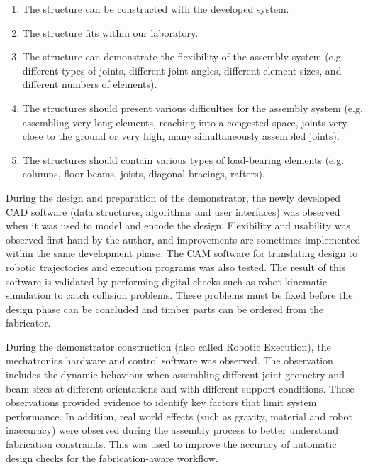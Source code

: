 \documentclass[11pt]{book}
\begin{document}
\begin{enumerate}
	\item The structure can be constructed with the developed system.

	\item The structure fits within our laboratory.

	\item The structure can demonstrate the flexibility of the assembly system (e.g. different types of joints, different joint angles, different element sizes, and different numbers of elements).

	\item The structures should present various difficulties for the assembly system (e.g. assembling very long elements, reaching into a congested space, joints very close to the ground or very high, many simultaneously assembled joints).

	\item The structures should contain various types of load-bearing elements (e.g. columns, floor beams, joists, diagonal bracings, rafters).

\end{enumerate}
During the design and preparation of the demonstrator, the newly developed CAD software (data structures, algorithms and user interfaces) was observed when it was used to model and encode the design. Flexibility and usability was observed first hand by the author, and improvements are sometimes implemented within the same development phase. The CAM software for translating design to robotic trajectories and execution programs was also tested. The result of this software is validated by performing digital checks such as robot kinematic simulation to catch collision problems. These problems must be fixed before the design phase can be concluded and timber parts can be ordered from the fabricator. 

During the demonstrator construction (also called Robotic Execution), the mechatronics hardware and control software was observed. The observation includes the dynamic behaviour when assembling different joint geometry and beam sizes at different orientations and with different support conditions. These observations provided evidence to identify key factors that limit system performance.  In addition, real world effects (such as gravity, material and robot inaccuracy) were observed during the assembly process to better understand fabrication constraints. This was used to improve the accuracy of automatic design checks for the fabrication-aware workflow.
\end{document}
